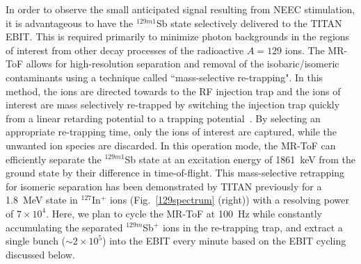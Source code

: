 \documentclass[12pt]{article}
\begin{document}
In order to observe the small anticipated signal resulting from NEEC stimulation, it is advantageous to have the $^{129m1}$Sb state selectively delivered to the TITAN EBIT.  This is required primarily to minimize photon backgrounds in the regions of interest from other decay processes of the radioactive $A=129$ ions.  The MR-ToF allows for high-resolution separation and removal of the isobaric/isomeric contaminants using a technique called ``mass-selective re-trapping".  In this method, the ions are directed towards to the RF injection trap and the ions of interest are mass selectively re-trapped by switching the injection trap quickly from a linear retarding potential to a trapping potential~\cite{Dickel2017}.  By selecting an appropriate re-trapping time, only the ions of interest are captured, while the unwanted ion species are discarded.  In this operation mode, the MR-ToF can efficiently separate the $^{129m1}$Sb state at an excitation energy of 1861~keV from the ground state by their difference in time-of-flight. This mass-selective retrapping for isomeric separation has been demonstrated by TITAN previously for a 1.8~MeV state in $^{127}$In$^+$ ions (Fig.~\ref{129spectrum} (right)) with a resolving power of $7\times10^4$.  Here, we plan to cycle the MR-ToF at 100~Hz while constantly accumulating the separated $^{129m}$Sb$^+$ ions in the re-trapping trap, and extract a single bunch ($\sim2\times10^5$) into the EBIT every minute based on the EBIT cycling discussed below.

\end{document}
